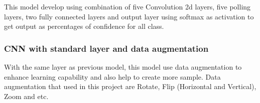 \documentclass[11pt]{article}
\begin{document}
This model develop using combination of five Convolution 2d layers, five
polling layers, two fully connected layers and output layer using
softmax as activation to get output as percentages of confidence for all
class.

    \hypertarget{cnn-with-standard-layer-and-data-augmentation}{%
\subsubsection{CNN with standard layer and data
augmentation}\label{cnn-with-standard-layer-and-data-augmentation}}

With the same layer as previous model, this model use data augmentation
to enhance learning capability and also help to create more sample. Data
augmentation that used in this project are Rotate, Flip (Horizontal and
Vertical), Zoom and etc.
\end{document}
